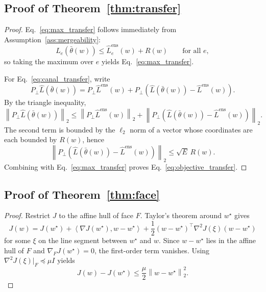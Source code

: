 \documentclass{article}
\theoremstyle{definition}
\newcommand{\norm}[1]{\left\lVert #1 \right\rVert}
\newcommand{\inner}[2]{\left\langle #1, #2 \right\rangle}
\newcommand{\paren}[1]{\left( #1 \right)}
\newcommand{\thetaw}{\bar{\theta}(w)}
\begin{document}
\subsection{Proof of Theorem~\ref{thm:transfer}}

\begin{proof}
Eq.~\eqref{eq:max_transfer} follows immediately from Assumption~\ref{ass:mergeability}:
\[
\widehat L_e(\thetaw) \le \widehat L_e^{\mathrm{ens}}(w)+R(w)
\qquad
\text{for all } e,
\]
so taking the maximum over \(e\) yields Eq.~\eqref{eq:max_transfer}.

For Eq.~\eqref{eq:canal_transfer}, write
\[
P_\perp \widehat L(\thetaw)
=
P_\perp \widehat L^{\mathrm{ens}}(w)
+ P_\perp\paren{\widehat L(\thetaw)-\widehat L^{\mathrm{ens}}(w)}.
\]
By the triangle inequality,
\[
\norm{P_\perp \widehat L(\thetaw)}_2
\le
\norm{P_\perp \widehat L^{\mathrm{ens}}(w)}_2
+ \norm{P_\perp\paren{\widehat L(\thetaw)-\widehat L^{\mathrm{ens}}(w)}}_2.
\]
The second term is bounded by the \(\ell_2\) norm of a vector whose coordinates are each bounded by \(R(w)\), hence
\[
\norm{P_\perp\paren{\widehat L(\thetaw)-\widehat L^{\mathrm{ens}}(w)}}_2
\le
\sqrt{E}\,R(w).
\]
Combining with Eq.~\eqref{eq:max_transfer} proves Eq.~\eqref{eq:objective_transfer}.
\end{proof}

\subsection{Proof of Theorem~\ref{thm:face}}

\begin{proof}
Restrict \(J\) to the affine hull of face \(F\). Taylor's theorem around \(w^\star\) gives
\[
J(w)
=
J(w^\star)
+ \inner{\nabla J(w^\star)}{w-w^\star}
+ \frac{1}{2}(w-w^\star)^\top \nabla^2 J(\xi)(w-w^\star)
\]
for some \(\xi\) on the line segment between \(w^\star\) and \(w\). Since \(w-w^\star\) lies in the affine hull of \(F\) and \(\nabla_F J(w^\star)=0\), the first-order term vanishes. Using \(\nabla^2 J(\xi)\vert_F \preceq \mu I\) yields
\[
J(w)-J(w^\star)
\le
\frac{\mu}{2}\norm{w-w^\star}_2^2.
\]
\end{proof}



\end{document}
